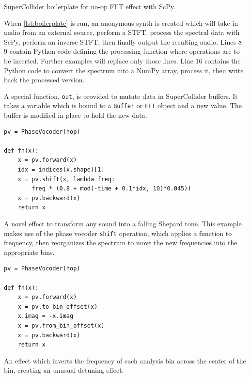 \documentclass{article}
\begin{document}
\begin{listing}[H]
    \inputminted[linenos=true]{SuperCollider}{../examples/template.sc}
    \caption{SuperCollider boilerplate for no-op FFT effect with ScPy.}
    \label{lst:boilerplate}
\end{listing}

When \autoref{lst:boilerplate} is run, an anonymous synth is created which will take in audio
from an external source, perform a STFT, process the spectral data with ScPy, perform an inverse
STFT, then finally output the resulting audio. Lines 8--9 contain Python code defining the
processing function where operations are to be inserted. Further examples will replace only those
lines. Line 16 contains the Python code to convert the spectrum into a NumPy array, process it,
then write back the processed version.

A special function, \texttt{out}, is provided to mutate data in SuperCollider buffers. It takes a
variable which is bound to a \texttt{Buffer} or \texttt{FFT} object and a new value. The buffer is
modified in place to hold the new data.

\begin{listing}[H]
    \begin{verbatim}
pv = PhaseVocoder(hop)

def fn(x):
    x = pv.forward(x)
    idx = indices(x.shape)[1]
    x = pv.shift(x, lambda freq:
        freq * (0.8 + mod(-time + 0.1*idx, 10)*0.045))
    x = pv.backward(x)
    return x
    \end{verbatim}
    \caption{A novel effect to transform any sound into a falling Shepard tone. This example makes
    use of the phase vocoder \texttt{shift} operation, which applies a function to frequency, then
    reorganizes the spectrum to move the new frequencies into the appropriate bins.}
    \label{lst:shepard}
\end{listing}

\begin{listing}[H]
    \begin{verbatim}
pv = PhaseVocoder(hop)

def fn(x):
    x = pv.forward(x)
    x = pv.to_bin_offset(x)
    x.imag = -x.imag
    x = pv.from_bin_offset(x)
    x = pv.backward(x)
    return x
    \end{verbatim}
    \caption{An effect which inverts the frequency of each analysis bin across the center of
    the bin, creating an unusual detuning effect.}
    \label{lst:binflipper}
\end{listing}
\end{document}
